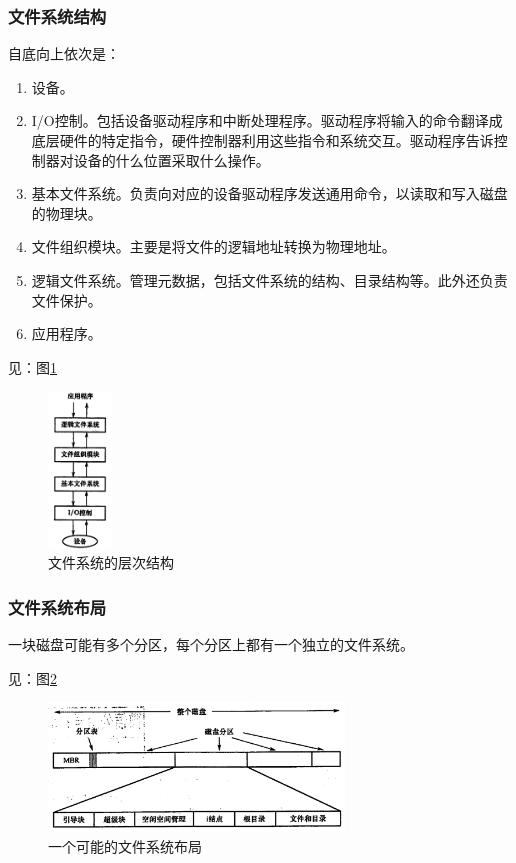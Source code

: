 \documentclass[12pt, a4paper, oneside]{ctexart}
\begin{document}
\subsubsection{文件系统结构}

自底向上依次是：
\begin{enumerate}
  \item 设备。
  \item I/O控制。包括设备驱动程序和中断处理程序。驱动程序将输入的命令翻译成底层硬件的特定指令，硬件控制器利用这些指令和系统交互。驱动程序告诉控制器对设备的什么位置采取什么操作。
  \item 基本文件系统。负责向对应的设备驱动程序发送通用命令，以读取和写入磁盘的物理块。
  \item 文件组织模块。主要是将文件的逻辑地址转换为物理地址。
  \item 逻辑文件系统。管理元数据，包括文件系统的结构、目录结构等。此外还负责文件保护。
  \item 应用程序。
\end{enumerate}

见：图\ref{fs-layer}

\begin{figure}
  \centering
  \includegraphics[width=0.15\textwidth]{./images/fs-layer.png}
  \caption{文件系统的层次结构}
  \label{fs-layer}
\end{figure}

\subsubsection{文件系统布局}

一块磁盘可能有多个分区，每个分区上都有一个独立的文件系统。

见：图\ref{fs-layout}

\begin{figure}
  \centering
  \includegraphics[width=0.7\textwidth]{./images/fs-layout.png}
  \caption{一个可能的文件系统布局}
  \label{fs-layout}
\end{figure}
\end{document}

